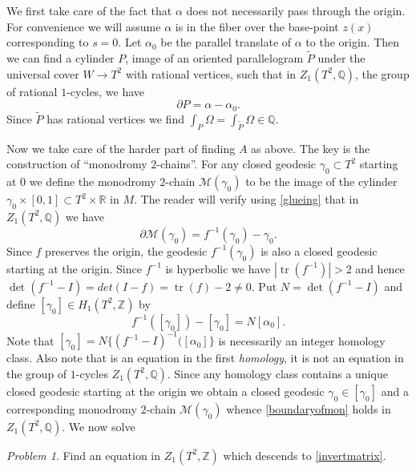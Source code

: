 \documentclass[12pt,leqno]{amsart}
\numberwithin{equation}{section}
\theoremstyle{plain}
\theoremstyle{definition}
\theoremstyle{remark}
\newtheorem{problem}[theorem]{Problem}
\newcommand{\R}{\mathbb{R}}
\newcommand{\Q}{\mathbb{Q}}
\newcommand{\Z}{\mathbb{Z}}
\newcommand{\tr}{\operatorname{tr}}
\begin{document}
We first take care of the fact that $\alpha$ does not necessarily pass through the origin. For convenience we will assume $\alpha$ is in the fiber over the base-point $z(x)$ corresponding to $s=0$. Let $\alpha_0$ be the parallel translate of $\alpha$ to the origin. Then we can find a cylinder $P$, image of an oriented parallelogram $\widetilde{P}$ under the universal cover $W \to T^2$ with rational vertices, such that in $Z_1(T^2,\Q)$, the group of rational $1$-cycles, we have
\begin{equation}\label{firstrectangle}
\partial P = \alpha - \alpha_0.
\end{equation}
Since $\widetilde{P}$ has rational vertices we find $\int_{P} \Omega = \int_{\widetilde{P}} \Omega \in \Q$.

Now we take care of the harder part of finding $A$ as above. The key is the construction  of ``monodromy $2$-chains''.  For any closed geodesic $\gamma_0 \subset T^2$ starting at $0$ we define the monodromy $2$-chain  $\mathcal{M}(\gamma_0)$ to be the image of the cylinder $\gamma_0 \times [0,1] \subset T^2 \times \R$ in $M$.
The reader will verify using \eqref{glueing} that in $Z_1(T^2,\Q)$ we have 
\begin{equation} \label{boundaryofmon}
 \partial \mathcal{M}(\gamma_0) = f^{-1}(\gamma_0) -\gamma_0.
\end{equation}
Since $f$ preserves the origin, the geodesic $f^{-1}(\gamma_0)$ is also a closed geodesic starting at the origin. Since $f^{-1}$ is hyperbolic we have $|\tr(f^{-1})| >2$ and hence $\det(f^{-1} -I)=  det( I - f) = \tr(f) -2 \neq 0$. Put $N= \det(f^{-1} -I)$ and define $[\gamma_0] \in H_1(T^2,\Z)$ by  
\begin{equation}\label{invertmatrix}
f^{-1}([\gamma_0]) -[\gamma_0] = N[\alpha_0]. 
\end{equation}
Note that $[\gamma_0] = N \{(f^{-1} - I)^{-1} ([\alpha_0] \}$ is necessarily an integer homology class. Also note that is an equation in the first {\it homology}, it is not an equation in the group of $1$-cycles $Z_1(T^2,\Q)$. Since any homology class contains a unique closed geodesic starting at the origin we obtain a closed geodesic $\gamma_0 \in [\gamma_0]$  and a corresponding  monodromy $2$-chain $\mathcal{M}(\gamma_0)$ whence \eqref{boundaryofmon} holds in $Z_1(T^2,\Q)$. We now solve

\begin{problem}
Find an equation in $Z_1(T^2,\Z)$ which descends to  \eqref{invertmatrix}. 
\end{problem}
\end{document}
